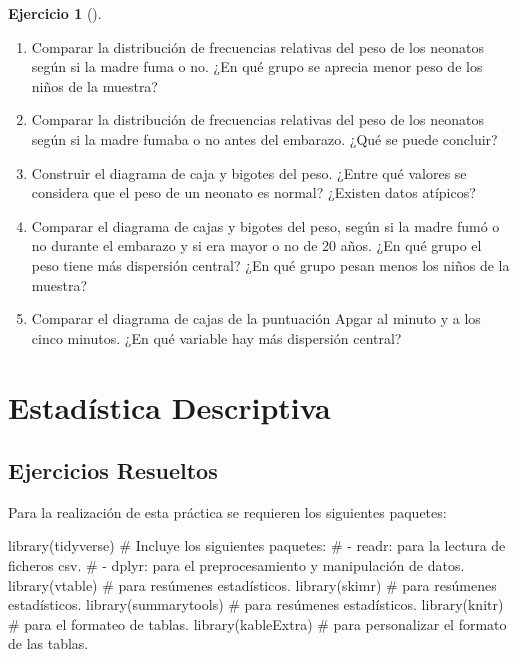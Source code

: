 \documentclass[
  a4paper,
]{scrreport}
\newenvironment{Shaded}{\begin{snugshade}}{\end{snugshade}}
\newcommand{\CommentTok}[1]{\textcolor[rgb]{0.37,0.37,0.37}{#1}}
\newcommand{\FunctionTok}[1]{\textcolor[rgb]{0.28,0.35,0.67}{#1}}
\newcommand{\NormalTok}[1]{\textcolor[rgb]{0.00,0.23,0.31}{#1}}
\theoremstyle{definition}
\newtheorem{exercise}{Ejercicio}[chapter]
\theoremstyle{remark}
\begin{document}
\begin{exercise}[]
\begin{enumerate}
\item
  Comparar la distribución de frecuencias relativas del peso de los
  neonatos según si la madre fuma o no. ¿En qué grupo se aprecia menor
  peso de los niños de la muestra?
\item
  Comparar la distribución de frecuencias relativas del peso de los
  neonatos según si la madre fumaba o no antes del embarazo. ¿Qué se
  puede concluir?
\item
  Construir el diagrama de caja y bigotes del peso. ¿Entre qué valores
  se considera que el peso de un neonato es normal? ¿Existen datos
  atípicos?
\item
  Comparar el diagrama de cajas y bigotes del peso, según si la madre
  fumó o no durante el embarazo y si era mayor o no de 20 años. ¿En qué
  grupo el peso tiene más dispersión central? ¿En qué grupo pesan menos
  los niños de la muestra?
\item
  Comparar el diagrama de cajas de la puntuación Apgar al minuto y a los
  cinco minutos. ¿En qué variable hay más dispersión central?
\end{enumerate}

\end{exercise}


\chapter{Estadística Descriptiva}\label{estaduxedstica-descriptiva}

\section{Ejercicios Resueltos}\label{ejercicios-resueltos-2}

Para la realización de esta práctica se requieren los siguientes
paquetes:

\begin{Shaded}
\begin{Highlighting}[]
\FunctionTok{library}\NormalTok{(tidyverse) }
\CommentTok{\# Incluye los siguientes paquetes:}
\CommentTok{\# {-} readr: para la lectura de ficheros csv. }
\CommentTok{\# {-} dplyr: para el preprocesamiento y manipulación de datos.}
\FunctionTok{library}\NormalTok{(vtable) }\CommentTok{\# para resúmenes estadísticos.}
\FunctionTok{library}\NormalTok{(skimr) }\CommentTok{\# para resúmenes estadísticos.}
\FunctionTok{library}\NormalTok{(summarytools) }\CommentTok{\# para resúmenes estadísticos.}
\FunctionTok{library}\NormalTok{(knitr) }\CommentTok{\# para el formateo de tablas.}
\FunctionTok{library}\NormalTok{(kableExtra) }\CommentTok{\# para personalizar el formato de las tablas.}
\end{Highlighting}
\end{Shaded}
\end{document}
